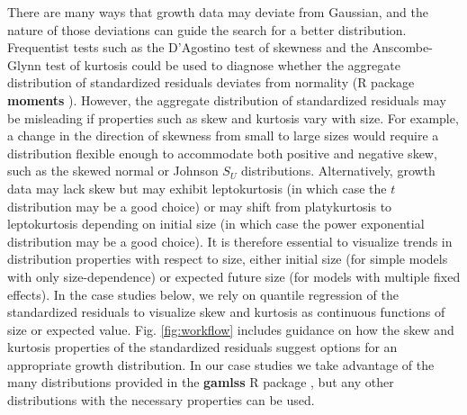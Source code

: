 \documentclass[12pt]{article}
\begin{document}
\begin{enumerate}[label=\arabic*., listparindent=1.5em]
There are many ways that growth data may deviate from Gaussian, and the nature of those deviations can guide the search for a better distribution. 
Frequentist tests such as the D'Agostino test of skewness \citep{d1970transformation} and the Anscombe-Glynn test of kurtosis \citep{anscombe1983distribution} could be used to diagnose whether the aggregate distribution of standardized residuals deviates from normality (R package \textbf{moments} \citep{komsta2015moments}). 
However, the aggregate distribution of standardized residuals may be misleading if properties such as skew and kurtosis vary with size. 
For example, a change in the direction of skewness from small to large sizes would require a distribution flexible enough to accommodate both positive and negative skew, such as the skewed normal or Johnson $S_{U}$ distributions. 
Alternatively, growth data may lack skew but may exhibit leptokurtosis (in which case the $t$ distribution may be a good choice) or may shift from platykurtosis to leptokurtosis depending on initial size (in which case the power exponential distribution may be a good choice). 
It is therefore essential to visualize trends in distribution properties with respect to size, either initial size (for simple models with only size-dependence) or expected future size (for models with multiple fixed effects). 
In the case studies below, we rely on quantile regression of the standardized residuals to visualize skew and kurtosis as continuous functions of size or expected value. 
Fig. \ref{fig:workflow} includes guidance on how the skew and kurtosis properties of the standardized residuals suggest options for an appropriate growth distribution. 
In our case studies we take advantage of the many distributions provided in the \textbf{gamlss} R package \citep{stasinopoulos2007generalized}, but any other distributions with the necessary properties can be used.  


\end{enumerate}
\end{document}
